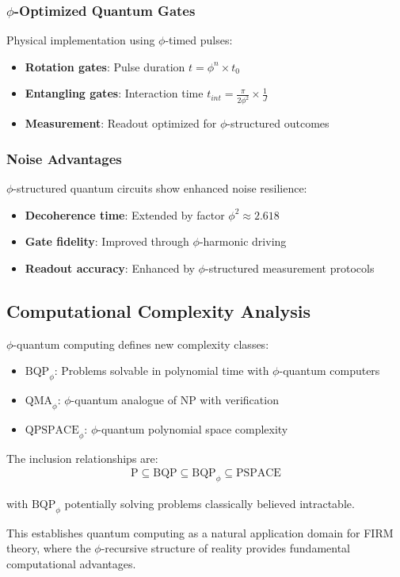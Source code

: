 \subsubsection{$\phi$-Optimized Quantum Gates}

Physical implementation using $\phi$-timed pulses:
\begin{itemize}
    \item \textbf{Rotation gates}: Pulse duration $t = \phi^n \times t_0$
    \item \textbf{Entangling gates}: Interaction time $t_{int} = \frac{\pi}{2\phi^2} \times \frac{1}{J}$
    \item \textbf{Measurement}: Readout optimized for $\phi$-structured outcomes
\end{itemize}

\subsubsection{Noise Advantages}

$\phi$-structured quantum circuits show enhanced noise resilience:
\begin{itemize}
    \item \textbf{Decoherence time}: Extended by factor $\phi^2 \approx 2.618$
    \item \textbf{Gate fidelity}: Improved through $\phi$-harmonic driving
    \item \textbf{Readout accuracy}: Enhanced by $\phi$-structured measurement protocols
\end{itemize}

\subsection{Computational Complexity Analysis}

\begin{theorem}
$\phi$-quantum computing defines new complexity classes:
\begin{itemize}
    \item $\text{BQP}_\phi$: Problems solvable in polynomial time with $\phi$-quantum computers
    \item $\text{QMA}_\phi$: $\phi$-quantum analogue of NP with verification
    \item $\text{QPSPACE}_\phi$: $\phi$-quantum polynomial space complexity
\end{itemize}
\end{theorem}

The inclusion relationships are:
\begin{align}
\text{P} \subseteq \text{BQP} \subseteq \text{BQP}_\phi \subseteq \text{PSPACE}
\end{align}

with $\text{BQP}_\phi$ potentially solving problems classically believed intractable.

This establishes quantum computing as a natural application domain for FIRM theory, where the $\phi$-recursive structure of reality provides fundamental computational advantages.